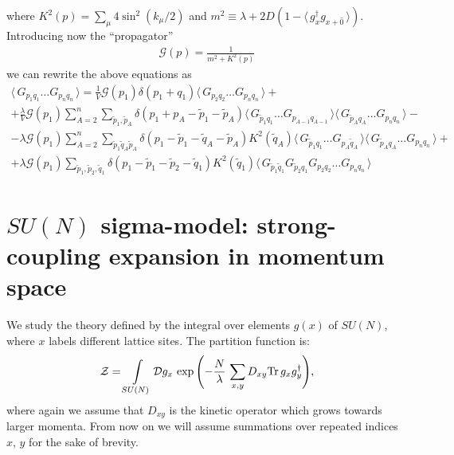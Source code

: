 \documentclass[twocolumn,showpacs,preprintnumbers,superscriptaddress,amsmath,floatfix,amssymb,secnumarabic]{revtex4}
\newcommand{\lr}[1]{ \left( #1 \right) }
\newcommand{\vev}[1]{ \langle \, #1 \, \rangle }
\newcommand{\tr}{ {\rm Tr} \, }
\newcommand{\expa}[1]{ \exp{\left( #1 \right)} }
\begin{document}
\begin{widetext}
where $K^2\lr{p} = \sum\limits_{\mu} 4 \sin^2\lr{k_{\mu}/2}$ and $m^2 \equiv \lambda + 2 D\lr{1 - \vev{g^{\dag}_x g_{x + \hat{0}}}}$. Introducing now the ``propagator''
\begin{eqnarray}
\label{propagator_def}
 \mathcal{G}\lr{p} = \frac{1}{m^2 + K^2\lr{p}}
\end{eqnarray}
we can rewrite the above equations as
\begin{eqnarray}
\label{sd_G_general_kappa_momentum}
 \vev{ G_{p_1 q_1} \ldots G_{p_n q_n} }
 =
  \frac{1}{V} \mathcal{G}\lr{p_1} \delta\lr{p_1 + q_1} \vev{G_{p_2 q_2} \ldots G_{p_n q_n}}
 + \nonumber \\ +
 \frac{\lambda}{V} \mathcal{G}\lr{p_1} \sum\limits_{A=2}^{n} \sum\limits_{\tilde{p}_1, \tilde{p}_A} \delta\lr{p_1 + p_A - \tilde{p}_1 - \tilde{p}_A} \vev{G_{\tilde{p}_1 q_1} \ldots G_{p_{A-1} q_{A-1}}} \vev{G_{\tilde{p}_A q_A} \ldots G_{p_n q_n}}
 - \nonumber \\ -
 \lambda \mathcal{G}\lr{p_1} \sum\limits_{A=2}^{n}
 \sum\limits_{\tilde{p}_1 \tilde{q}_A \tilde{p}_A}
 \delta\lr{p_1 - \tilde{p}_1 - \tilde{q}_A - \tilde{p}_A}
 K^2\lr{\tilde{q}_A}
 \vev{G_{\tilde{p}_1 q_1} \ldots G_{p_{A} \tilde{q}_A}} \vev{G_{\tilde{p}_A q_A} \ldots G_{p_n q_n}}
 + \nonumber \\ +
 \lambda \mathcal{G}\lr{p_1} \sum\limits_{\tilde{p}_1, \tilde{p}_2, \tilde{q}_1}
 \delta\lr{p_1 - \tilde{p}_1 - \tilde{p}_2 - \tilde{q}_1} K^2\lr{\tilde{q}_1} \vev{G_{\tilde{p}_1 \tilde{q}_1} G_{\tilde{p}_2 q_1} G_{p_2 q_2} \ldots G_{p_n q_n}}
\end{eqnarray}
\end{widetext}


\section*{$SU\lr{N}$ sigma-model: strong-coupling expansion in momentum space}
\label{sec:introduction}

 We study the theory defined by the integral over elements $g\lr{x}$ of $SU\lr{N}$, where $x$ labels different lattice sites. The partition function is:
\begin{eqnarray}
\label{pf_def}
\mathcal{Z} = \int\limits_{SU\lr{N}} \mathcal{D} g_x \,
\expa{-\frac{N}{\lambda}\, \sum \limits_{x,y} D_{xy} \tr g_x g^{\dag}_y } ,
\end{eqnarray}
where again we assume that $D_{xy}$ is the kinetic operator which grows towards larger momenta. From now on we will assume summations over repeated indices $x$, $y$ for the sake of brevity.
\end{document}
